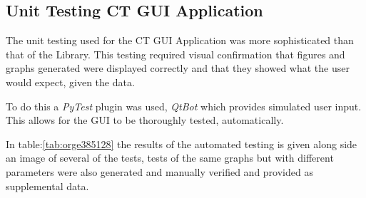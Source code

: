 \documentclass[11pt]{report}
\begin{document}
\clearpage

\subsection{Unit Testing CT GUI Application}
\label{sec:org8dcbc8e}

The unit testing used for the CT GUI Application was more sophisticated than that of the Library. This testing required visual confirmation that figures and graphs generated were displayed correctly and that they showed what the user would expect, given the data.

To do this a \emph{PyTest} plugin was used, \emph{QtBot} which provides simulated user input. This allows for the GUI to be thoroughly tested, automatically.

In table:\ref{tab:orge385128} the results of the automated testing is given along side an image of several of the tests, tests of the same graphs but with different parameters were also generated and manually verified and provided as supplemental data.
\end{document}
